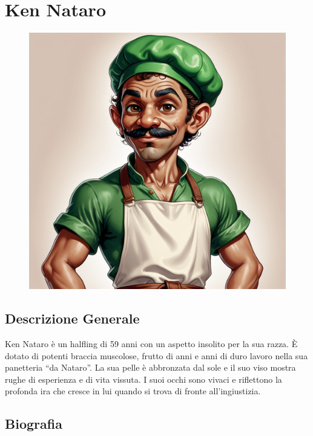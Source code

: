 \section{Ken Nataro}\label{ken-nataro}


\begin{figure}
\centering
\includegraphics{create-a-digital-illustration-of-ken-nataro-a-mulatto-skinned-halfling-with-a-sturdy-physique-ken--7.png}
\end{figure}

\subsection{Descrizione Generale}\label{descrizione-generale}



Ken Nataro è un halfling di 59 anni con un aspetto insolito per la sua
razza. È dotato di potenti braccia muscolose, frutto di anni e anni di
duro lavoro nella sua panetteria ``da Nataro''. La sua pelle è
abbronzata dal sole e il suo viso mostra rughe di esperienza e di vita
vissuta. I suoi occhi sono vivaci e riflettono la profonda ira che
cresce in lui quando si trova di fronte all'ingiustizia.

\subsection{Biografia}\label{biografia}


